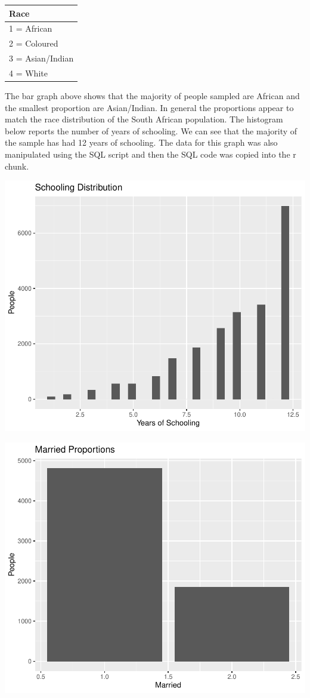 \documentclass[11pt,preprint, authoryear]{elsarticle}
\numberwithin{equation}{section}
\numberwithin{figure}{section}
\numberwithin{table}{section}
\begin{document}
\begin{tabular}{l}
\hline
Race\\
\hline
1 = African\\
\hline
2 = Coloured\\
\hline
3 = Asian/Indian\\
\hline
4 = White\\
\hline
\end{tabular}

The bar graph above shows that the majority of people sampled are
African and the smallest proportion are Asian/Indian. In general the
proportions appear to match the race distribution of the South African
population. The histogram below reports the number of years of
schooling. We can see that the majority of the sample has had 12 years
of schooling. The data for this graph was also manipulated using the SQL
script and then the SQL code was copied into the r chunk.

\includegraphics{20346212MLProject_files/figure-latex/unnamed-chunk-5-1.pdf}

\includegraphics{20346212MLProject_files/figure-latex/unnamed-chunk-7-1.pdf}
\end{document}
